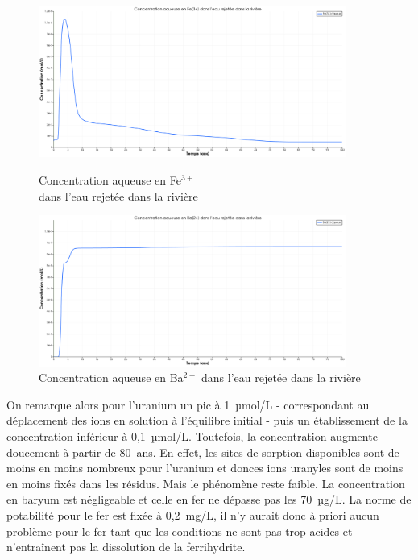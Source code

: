 \documentclass{article}
\begin{document}
\begin{figure}[t]
    \centering
    \begin{minipage}{0.5\textwidth}
        \centering
        \includegraphics[width=0.9\textwidth]{III_B_2_7.png} 
        \caption{Concentration aqueuse en Fe$^{3+}$ \\dans l'eau rejetée dans la rivière}
        \label{fig:Fe_riviere_sable_Base}
    \end{minipage}\hfill
    \begin{minipage}{0.5\textwidth}
        \centering
        \includegraphics[width=0.9\textwidth]{III_B_2_8.png} 
        \caption{Concentration aqueuse en Ba$^{2+}$ dans l'eau rejetée dans la rivière}
        \label{fig:Ba_riviere_sable_base}
    \end{minipage}
\end{figure}


On remarque alors pour l’uranium un pic à 1~µmol/L - correspondant au déplacement des ions en solution à l’équilibre initial - puis un établissement de la concentration inférieur à 0,1~µmol/L. Toutefois, la concentration augmente doucement à partir de 80~ans. En effet, les sites de sorption disponibles sont de moins en moins nombreux pour l'uranium et donces ions uranyles sont de moins en moins fixés dans les résidus. Mais le phénomène reste faible. La concentration en baryum est négligeable et celle en fer ne dépasse pas les 70~µg/L. La norme de potabilité pour le fer est fixée à 0,2~mg/L, il n’y aurait donc à priori aucun problème pour le fer tant que les conditions ne sont pas trop acides et n'entraînent pas la dissolution de la ferrihydrite.
\end{document}
